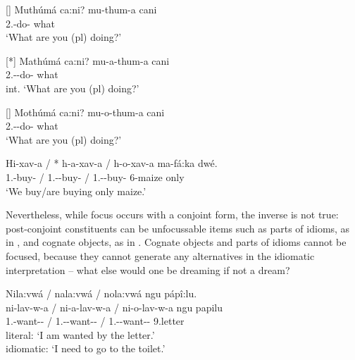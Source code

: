 \documentclass[output=paper]{langscibook}
\begin{document}
\ea
\label{bkm:Ref120706074}
\ea
[]{
{Muthúmá ca:ni?}\jambox*{[conjoint]}
\gll
mu-thum-a  cani\\
2\PL.\SM{}-do-\FV{}  what\\
\glt
‘What are you (pl) doing?’\\
}


\ex
[*]{
{Mathúmá ca:ni?}\jambox*{[disjoint]}
\gll
mu-a-thum-a  cani\\
2\PL.\SM-\DJ{}-do-\FV{}  what\\
\glt
int. ‘What are you (pl) doing?’\\
}


\ex
[]{
{Mothúmá ca:ni?}\jambox*{[progressive]}
\gll
mu-o-thum-a  cani\\
2\PL.\SM{}-\PROG{}-do-\FV{}  what\\
\glt
‘What are you (pl) doing?’\\
}

\z
\z

\ea
\label{bkm:Ref120706082}
\gll
Hi-xav-a   / * h-a-xav-a   / h-o-xav-a  ma-fá:ka  dwé.\\
1\PL.\SM{}-buy-\FV{}  / {} 1\PL.\SM{}-\DJ{}-buy-\FV{}   / 1\PL.\SM{}-\PROG{}-buy-\FV{}  6-maize  only\\
\glt
‘We buy/are buying only maize.’\\

\z

Nevertheless, while focus occurs with a conjoint form, the inverse is not true: post-conjoint constituents can be unfocussable items such as parts of idioms, as in , and cognate objects, as in . Cognate objects and parts of idioms cannot be focused, because they cannot generate any alternatives in the idiomatic interpretation \citep[see][]{vanderWal2016,vanderWal2021a} – what else would one be dreaming if not a dream?

\ea
\label{bkm:Ref120706130}
Nila:vwá / nala:vwá / nola:vwá ngu pápî:lu.\\
\gll
ni-lav-w-a  / ni-a-lav-w-a  / ni-o-lav-w-a  ngu  papilu\\
1\SG.\SM{}-want-\PASS{}-\FV{}  / 1\SG.\SM{}-\DJ{}-want-\PASS{}-\FV{}  / 1\SG.\SM{}-\PROG{}-want-\PASS{}-\FV{}  \PREP{}  9.letter\\
\glt
literal: ‘I am wanted by the letter.’\\
idiomatic: ‘I need to go to the toilet.’
\end{document}
